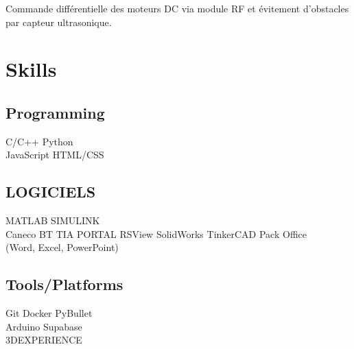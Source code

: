 \documentclass[]{plushcv}
\begin{document}
\begin{minipage}[t]{0.72\textwidth}
\vspace{\topsep}
\begin{tightemize}
\item Commande différentielle des moteurs DC via module RF et évitement d'obstacles par capteur ultrasonique.
\end{tightemize}
\vspace{-3pt}

%
%

\end{minipage} 
\hfill
\begin{minipage}[t]{0.24\textwidth} 

\section{Skills}
\sectionsep
\vspace{2pt}

\subsection{Programming}
\sectionsep
C/C++ \textbullet{} Python \textbullet{}\\ JavaScript \textbullet{} HTML/CSS
\sectionsep
\vspace{2pt}

\subsection{LOGICIELS}
\sectionsep
MATLAB \textbullet{} SIMULINK \textbullet{} \\Caneco BT \textbullet{} TIA PORTAL \textbullet{} RSView \textbullet{} 
SolidWorks \textbullet{} TinkerCAD  \textbullet{} 
Pack Office \\(Word, Excel, PowerPoint)
\vspace{2pt}

\sectionsep
\subsection{Tools/Platforms}
\sectionsep
Git \textbullet{} Docker \textbullet{} PyBullet \\
Arduino \textbullet{} Supabase \textbullet{}\\ 3DEXPERIENCE \\
\sectionsep


\end{minipage}
\end{document}
